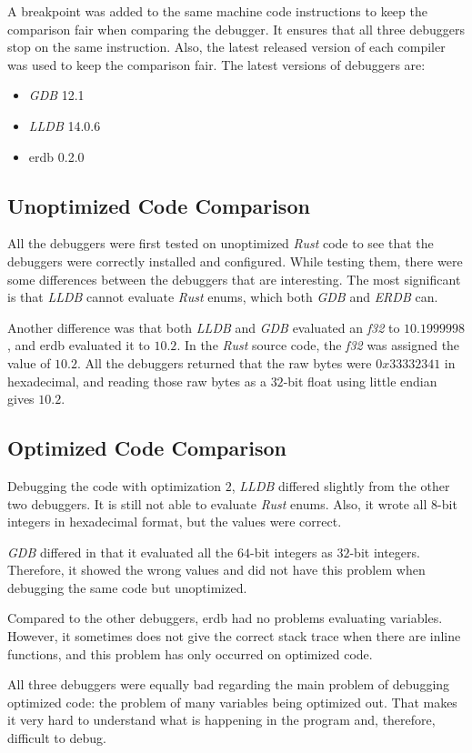A breakpoint was added to the same machine code instructions to keep the comparison fair when comparing the debugger.
It ensures that all three debuggers stop on the same instruction.
Also, the latest released version of each compiler was used to keep the comparison fair.
The latest versions of debuggers are:


\begin{itemize}
    \item \emph{GDB} 12.1
    \item \emph{LLDB} 14.0.6
    \item \gls{erdb} 0.2.0 %
\end{itemize}




\subsection{Unoptimized Code Comparison}
All the debuggers were first tested on unoptimized \emph{Rust} code to see that the debuggers were correctly installed and configured.
While testing them, there were some differences between the debuggers that are interesting.
The most significant is that \emph{LLDB} cannot evaluate \emph{Rust} enums, which both \emph{GDB} and \emph{ERDB} can.


Another difference was that both \emph{LLDB} and \emph{GDB} evaluated an \emph{f32} to $10.1999998$, and \gls{erdb} evaluated it to $10.2$.
In the \emph{Rust} source code, the \emph{f32} was assigned the value of $10.2$.
All the debuggers returned that the raw bytes were $0x33332341$ in hexadecimal, and reading those raw bytes as a $32$-bit float using little endian gives $10.2$.



\subsection{Optimized Code Comparison}
Debugging the code with optimization $2$, \emph{LLDB} differed slightly from the other two debuggers.
It is still not able to evaluate \emph{Rust} enums.
Also, it wrote all $8$-bit integers in hexadecimal format, but the values were correct.


\emph{GDB} differed in that it evaluated all the $64$-bit integers as $32$-bit integers.
Therefore, it showed the wrong values and did not have this problem when debugging the same code but unoptimized.


Compared to the other debuggers, \gls{erdb} had no problems evaluating variables.
However, it sometimes does not give the correct stack trace when there are inline functions, and this problem has only occurred on optimized code.


All three debuggers were equally bad regarding the main problem of debugging optimized code: the problem of many variables being optimized out.
That makes it very hard to understand what is happening in the program and, therefore, difficult to debug.

